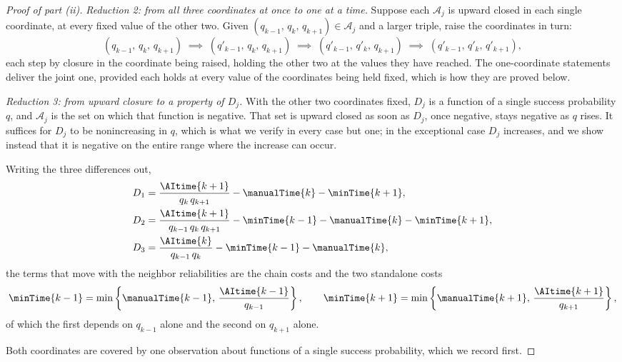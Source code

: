 \begin{proof}[Proof of part (ii)]
\emph{Reduction 2: from all three coordinates at once to one at a time.}
Suppose each $\mathcal{A}_j$ is upward closed in each single coordinate, at every fixed value of the other two.
Given $(q_{k-1},\, q_k,\, q_{k+1}) \in \mathcal{A}_j$ and a larger triple, raise the coordinates in turn:
\[ (q_{k-1},\, q_k,\, q_{k+1}) \;\implies\; (q'_{k-1},\, q_k,\, q_{k+1}) \;\implies\; (q'_{k-1},\, q'_k,\, q_{k+1}) \;\implies\; (q'_{k-1},\, q'_k,\, q'_{k+1}) , \]
each step by closure in the coordinate being raised, holding the other two at the values they have reached.
The one-coordinate statements deliver the joint one, provided each holds at every value of the coordinates being held fixed, which is how they are proved below.

\emph{Reduction 3: from upward closure to a property of $D_j$.}
With the other two coordinates fixed, $D_j$ is a function of a single success probability $q$, and $\mathcal{A}_j$ is the set on which that function is negative.
That set is upward closed as soon as $D_j$, once negative, stays negative as $q$ rises.
It suffices for $D_j$ to be nonincreasing in $q$, which is what we verify in every case but one; in the exceptional case $D_j$ increases, and we show instead that it is negative on the entire range where the increase can occur.

Writing the three differences out,
\begin{align*}
D_1 &= \frac{\AItime{k+1}}{q_k\, q_{k+1}} - \manualTime{k} - \minTime{k+1}, \\
D_2 &= \frac{\AItime{k+1}}{q_{k-1}\, q_k\, q_{k+1}} - \minTime{k-1} - \manualTime{k} - \minTime{k+1}, \\
D_3 &= \frac{\AItime{k}}{q_{k-1}\, q_k} - \minTime{k-1} - \manualTime{k},
\end{align*}
the terms that move with the neighbor reliabilities are the chain costs and the two standalone costs
\[ \minTime{k-1} = \min\left\{ \manualTime{k-1},\, \frac{\AItime{k-1}}{q_{k-1}} \right\}, \qquad \minTime{k+1} = \min\left\{ \manualTime{k+1},\, \frac{\AItime{k+1}}{q_{k+1}} \right\}, \]
of which the first depends on $q_{k-1}$ alone and the second on $q_{k+1}$ alone.

Both coordinates are covered by one observation about functions of a single success probability, which we record first.


\end{proof}
